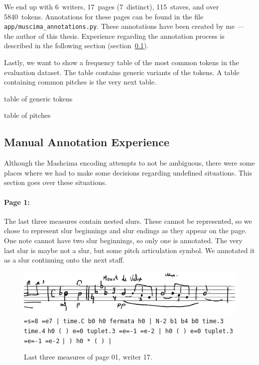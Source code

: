 We end up with 6~writers, 17~pages (7~distinct), 115~staves, and over 5840~tokens. Annotations for these pages can be found in the file \verb`app/`\allowbreak\verb`mus`\allowbreak\verb`ci`\allowbreak\verb`ma_`\allowbreak\verb`annota`\allowbreak\verb`tions.py`. These annotations have been created by me --- the author of this thesis. Experience regarding the annotation process is described in the following section (section~\ref{sec:ManualAnnotationExperience}).

Lastly, we want to show a frequency table of the most common tokens in the evaluation dataset. The table contains generic variants of the tokens. A table containing common pitches is the very next table.

\begin{code}
table of generic tokens
\end{code}

\begin{code}
table of pitches
\end{code}

\newpage


\subsection{Manual Annotation Experience}
\label{sec:ManualAnnotationExperience}

Although the Mashcima encoding attempts to not be ambiguous, there were some places where we had to make some decisions regarding undefined situations. This section goes over these situations.

\paragraph{Page 1:} The last three measures contain nested slurs. These cannot be represented, so we chose to represent slur beginnings and slur endings as they appear on the page. One note cannot have two slur beginnings, so only one is annotated. The very last slur is maybe not a slur, but some pitch articulation symbol. We annotated it as a slur continuing onto the next staff.

\begin{figure}[h]
    \centering
    \includegraphics[width=140mm]{../img/ae-01}
    \verb`=s=8 =e7 | time.C b0 h0 fermata h0 | N-2 b1 b4 b0 time.3 time.4`
    \verb`h0 ( ) e=0 tuplet.3 =e=-1 =e-2 | h0 ( ) e=0 tuplet.3 =e=-1 =e-2`
    \verb`| ) h0 * ( ) |`
    \caption{Last three measures of page 01, writer 17.}
    \label{fig6:AnnotationExperience01}
\end{figure}

